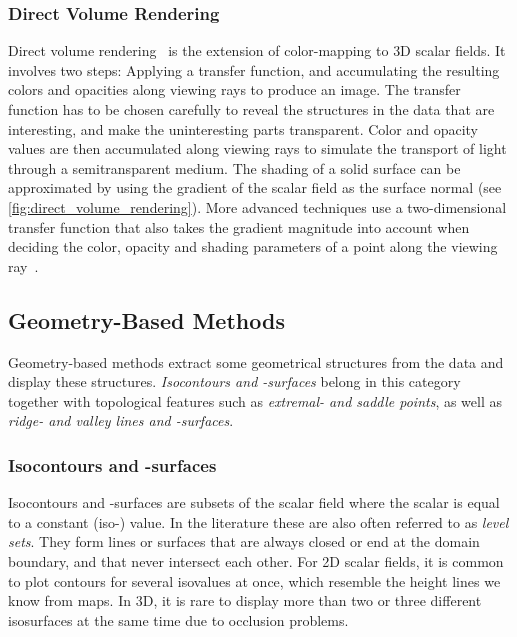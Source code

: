 %
\subsubsection{Direct Volume Rendering}
%
Direct volume rendering~\cite{Levoy1988,Drebin1988} is the extension of
color-mapping to \ac{3D} scalar fields.
%
It involves two steps: Applying a transfer function, and accumulating the
resulting colors and opacities along viewing rays to produce an image.
%
The transfer function has to be chosen carefully to reveal the structures in the
data that are interesting, and make the uninteresting parts transparent.
%
Color and opacity values are then accumulated along viewing rays to simulate the
transport of light through a semitransparent medium.
%
The shading of a solid surface can be approximated by using the gradient of the
scalar field as the surface normal (see \autoref{fig:direct_volume_rendering}).
%
More advanced techniques use a two-dimensional transfer function that also takes
the gradient magnitude into account when deciding the color, opacity and
shading parameters of a point along the viewing ray~\cite{Kindlmann1998}.
%

\subsection{Geometry-Based Methods} %
\label{sub:scalar_geometry_based}
%
Geometry-based methods extract some geometrical structures from the data and
display these structures.
%
\emph{Isocontours and -surfaces} belong in this category together with
topological features such as \emph{extremal- and saddle points}, as well as
\emph{ridge- and valley lines and -surfaces}.
%

%
\subsubsection{Isocontours and -surfaces}
%
Isocontours and -surfaces are subsets of the scalar field where the
scalar is equal to a constant (iso-) value.
%
In the literature these are also often referred to as \emph{level sets}.
%
They form lines or surfaces that are always closed or end at the domain
boundary, and that never intersect each other.
%
For \ac{2D} scalar fields, it is common to plot contours for several isovalues
at once, which resemble the height lines we know from maps.
%
In \ac{3D}, it is rare to display more than two or three different isosurfaces
at the same time due to occlusion problems.
%

